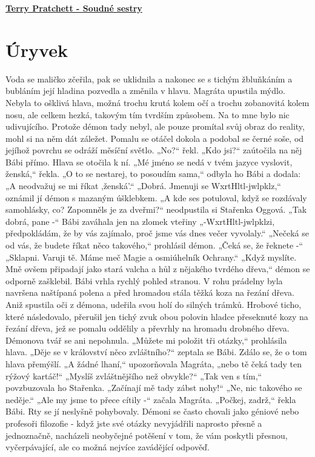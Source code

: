 \documentclass[11pt]{article}
\begin{document}
    \begin{center}
        \underline{\textbf{\Huge Terry Pratchett - Soudné sestry}}
    \end{center}
    \section*{Úryvek}
    Voda se maličko zčeřila, pak se uklidnila a nakonec se s tichým žbluňkáním a bubláním její hladina pozvedla a změnila v hlavu. Magráta upustila mýdlo.
Nebyla to ošklivá hlava, možná trochu krutá kolem očí a trochu zobanovitá kolem nosu, ale celkem hezká, takovým tím tvrdším způsobem. Na to mne bylo nic udivujícího. Protože démon tady nebyl, ale pouze promítal svůj obraz do reality, mohl si na něm dát záležet. Pomalu se otáčel dokola a podobal se černé soše, od jejíhož povrchu se odráží měsíční
světlo.
„No?“ řekl.
„Kdo jsi?“ zaútočila na něj Bábi přímo.
Hlava se otočila k ní.
„Mé jméno se nedá v tvém jazyce vyslovit, ženská,“ řekla.
„O to se nestarej, to posoudím sama,“ odbyla ho Bábi a dodala: „A neodvažuj se mi říkat ,ženská’.“
„Dobrá. Jmenuji se WxrtHltl-jwlpklz,“ oznámil jí démon s mazaným úšklebkem.
„A kde ses potuloval, když se rozdávaly samohlásky, co? Zapomněls je za dveřmi?“ neodpustila si Stařenka Oggová.
„Tak dobrá, pane -“ Bábi zaváhala jen na zlomek vteřiny „-WxrtHltl-jwlpklzi, předpokládám, že by vás zajímalo, proč jsme vás dnes večer vyvolaly.“
„Nečeká se od vás, že budete říkat něco takového,“ prohlásil démon. „Čeká se, že řeknete -“
„Sklapni. Varuji tě. Máme meč Magie a osmiúhelník Ochrany.“
„Když myslíte. Mně ovšem připadají jako stará valcha a hůl z nějakého tvrdého dřeva,“ démon se odporně zašklebil.
Bábi vrhla rychlý pohled stranou. V rohu prádelny byla navršena naštípaná polena a před hromadou stála těžká koza na řezání dřeva. Aniž spustila oči z démona, udeřila svou holí do silných trámků.
Hrobové ticho, které následovalo, přerušil jen tichý zvuk obou polovin hladce přeseknuté kozy na řezání dřeva, jež se pomalu oddělily a převrhly na hromadu drobného dřeva.
Démonova tvář se ani nepohnula.
„Můžete mi položit tři otázky,“ prohlásila hlava.
„Děje se v království něco zvláštního?“ zeptala se Bábi.
Zdálo se, že o tom hlava přemýšlí.
„A žádné lhaní,“ upozorňovala Magráta, „nebo tě čeká tady ten rýžový kartáč!“
„Myslíš zvláštnějšího než obvykle?“
„Tak ven s tím,“ povzbuzovala ho Stařenka. „Začínají mě tady zábst nohy!“
„Ne, nic takového se neděje.“
„Ale my jsme to přece cítily -“ začala Magráta.
„Počkej, zadrž,“ řekla Bábi. Rty se jí neslyšně pohybovaly. Démoni se často chovali jako géniové nebo profesoři filozofie - když jste své otázky nevyjádřili naprosto přesně a jednoznačně, nacházeli neobyčejné potěšení v tom, že vám poskytli přesnou, vyčerpávající, ale co možná nejvíce zavádějící odpověď.
\end{document}
